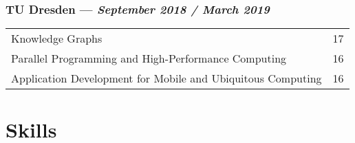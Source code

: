 \documentclass{article}
\begin{document}
\subsubsection*{TU Dresden --- \emph{September 2018 / March 2019}}

\begin{tabular}{l|r}
    Knowledge Graphs                                            & 17 \\
    Parallel Programming and High-Performance Computing         & 16 \\
    Application Development for Mobile and Ubiquitous Computing & 16 \\
\end{tabular}
\section*{Skills}
\end{document}
